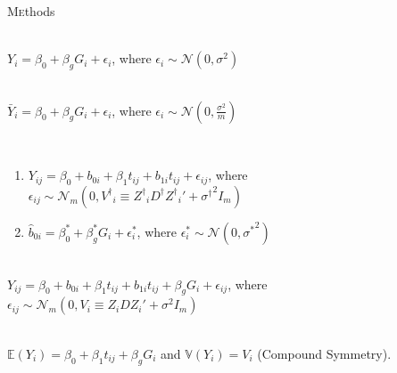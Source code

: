 \begin{frame}{\lettrine{M}ethods}
\par{
\begin{description}
    \item<1->[Linear Model (Baseline)] \hfill \\\hspace{-5em} $Y_i = \beta_0 + \beta_gG_i + \epsilon_i${\footnotesize{, where $\epsilon_i\sim\mathcal{N}(0, \sigma^2)$}}\\
    \item<2->[Linear Model (Average of $m$ measures)] \hfill \\\hspace{-5em} $\bar{Y}_{i} = \beta_{0} + \beta_gG_i + \epsilon_{i}${\footnotesize{, where $\epsilon_i\sim\mathcal{N}(0, \frac{\sigma^2}{m})$}}\\
    \item<3->[Two-Step] \hfill \\ \vspace{-0.5em}
        \begin{enumerate}\setlength{\itemindent}{-7em}
            \item $Y_{ij} = \beta_{0} + b_{0i} + \beta_{1}t_{ij} + b_{1i}t_{ij} + \epsilon_{ij}${\footnotesize{, where $\epsilon_{ij}\sim{\mathcal{N}}_m(0, V^\dagger{}_i\equiv Z^\dagger{}_iD^\dagger{}Z^\dagger{}_i'+{\sigma^\dagger{}}^2I_m)$}}
            \item $\hat{b}_{0i} = \beta_0^* + \beta_g^*G_i + \epsilon_{i}^*${\footnotesize{, where $\epsilon_{i}^*\sim\mathcal{N}(0, {\sigma^*}^2)$}}
        \end{enumerate}
    \item<4->[Linear Mixed Model (LMM)] \hfill \\\hspace{-5em} $Y_{ij} = \beta_{0} + b_{0i} + \beta_{1}t_{ij} + b_{1i}t_{ij} + \beta_gG_i + \epsilon_{ij}${\footnotesize{, where $\epsilon_{ij}\sim{\mathcal{N}}_m(0, V_i\equiv Z_iDZ_i'+\sigma^2I_m)$}}\\
    \item<5->[Generalised Estimating Equations (GEE)] \hfill \\\hspace{-5em} $\mathbb{E}(Y_i) = \beta_{0} + \beta_{1}t_{ij} + \beta_gG_i$ and $\mathbb{V}(Y_i)=V_i$ (Compound Symmetry).\\
\end{description}
}
\end{frame}
